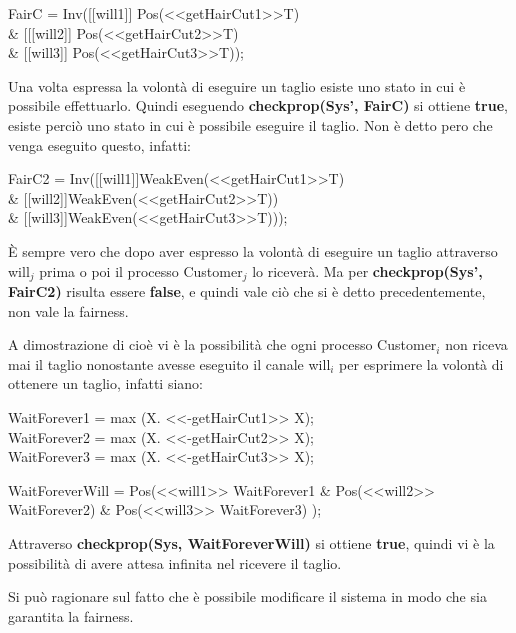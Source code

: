 \begin{center}
	\textsf{FairC = Inv([[will1]] Pos(<<getHairCut1>>T) \\\& [[[will2]] Pos(<<getHairCut2>>T) \\\& [[will3]] Pos(<<getHairCut3>>T)); }
\end{center}

Una volta espressa la volontà di eseguire un taglio esiste uno stato in cui è possibile effettuarlo. Quindi eseguendo \textbf{checkprop(Sys', FairC)} si ottiene \textbf{true}, esiste perciò uno stato in cui è possibile eseguire il taglio. Non è detto pero che venga eseguito questo, infatti:

\begin{center}
	\textsf{FairC2 = Inv([[will1]]WeakEven(<<getHairCut1>>T) \\\& [[will2]]WeakEven(<<getHairCut2>>T)) \\\& [[will3]]WeakEven(<<getHairCut3>>T)));}
\end{center}

È sempre vero che dopo aver espresso la volontà di eseguire un taglio attraverso \textsf{will$_{j}$} prima o poi il processo \textsf{Customer$_{j}$} lo riceverà. Ma per\textbf{ checkprop(Sys', FairC2)} risulta essere \textbf{false}, e quindi vale ciò che si è detto precedentemente, non vale la fairness.


A dimostrazione di cioè vi è la possibilità che ogni processo \textsf{Customer$_{i}$} non riceva mai il taglio nonostante avesse eseguito il canale \textsf{will$_{i}$} per esprimere la volontà di ottenere un taglio, infatti siano:\\
\begin{center}
	\textsf{WaitForever1 = max (X. <<-getHairCut1>> X);}\\
	\textsf{WaitForever2 = max (X. <<-getHairCut2>> X);}\\
	\textsf{WaitForever3 = max (X. <<-getHairCut3>> X);}\\\mbox{}
	
	
	\textsf{WaitForeverWill = Pos(<<will1>> WaitForever1 \& Pos(<<will2>> WaitForever2) \& Pos(<<will3>> WaitForever3) );}
\end{center}

Attraverso \textbf{checkprop(Sys, WaitForeverWill)} si ottiene \textbf{true}, quindi vi è la possibilità di avere attesa infinita nel ricevere il taglio.

Si può ragionare sul fatto che è possibile modificare il sistema in modo che sia garantita la fairness.

